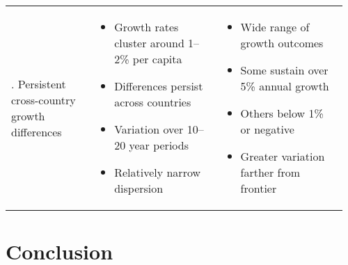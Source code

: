 \documentclass[\topdir/lecture\_notes.tex]{subfiles}
\begin{document}
\begin{landscape}
\begin{longtable}{>{\RaggedRight}p{0.24\linewidth}
        >{\RaggedRight}p{0.36\linewidth}
        >{\RaggedRight\arraybackslash}p{0.36\linewidth}}
        6. Persistent cross-country growth differences &
        \vspace{-0.5\baselineskip}\begin{itemize}[leftmargin=*, topsep=0pt, itemsep=2pt, parsep=0pt, partopsep=0pt]
            \item Growth rates cluster around 1--2\% per capita
            \item Differences persist across countries
            \item Variation over 10--20 year periods
            \item Relatively narrow dispersion
        \end{itemize}\vspace{-0.3\baselineskip} &
        \vspace{-0.5\baselineskip}\begin{itemize}[leftmargin=*, topsep=0pt, itemsep=2pt, parsep=0pt, partopsep=0pt]
            \item Wide range of growth outcomes
            \item Some sustain over 5\% annual growth
            \item Others below 1\% or negative
            \item Greater variation farther from frontier
        \end{itemize}\vspace{-0.3\baselineskip}
        \\
    \end{longtable}
    \endgroup
\end{landscape}

\pagestyle{fancy}

\section{Conclusion}
\end{document}
